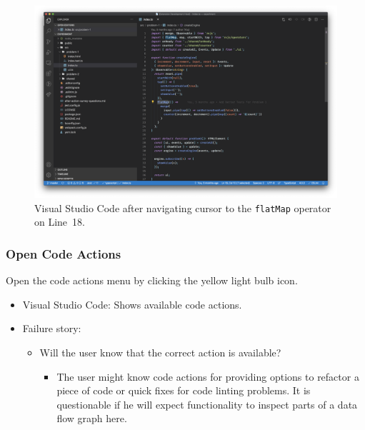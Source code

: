 \documentclass[sigplan,screen,nonacm,review]{acmart}
\begin{document}
\begin{figure}[ht]
	\centering
	\includegraphics[width=\columnwidth]{walkthrough-screenshots/step2.png}
	\Description{}
	\caption{Visual Studio Code after navigating cursor to the \texttt{flatMap} operator on Line~18.}
	\label{fig:walkthrough-screesnhot-step-2}
\end{figure}


\subsubsection{Open Code Actions}
Open the code actions menu by clicking the yellow light bulb icon.

\begin{itemize}
	\item Visual Studio Code: Shows available code actions.
	\item Failure story:
	      \begin{itemize}
	      	\item Will the user know that the correct action is available?
	      	      \begin{itemize}
	      	      	\item The user might know code actions for providing options to refactor a piece of code or quick fixes for code linting problems. It is questionable if he will expect functionality to inspect parts of a data flow graph here.
	      	      \end{itemize}
	      \end{itemize}
\end{itemize}
\end{document}
